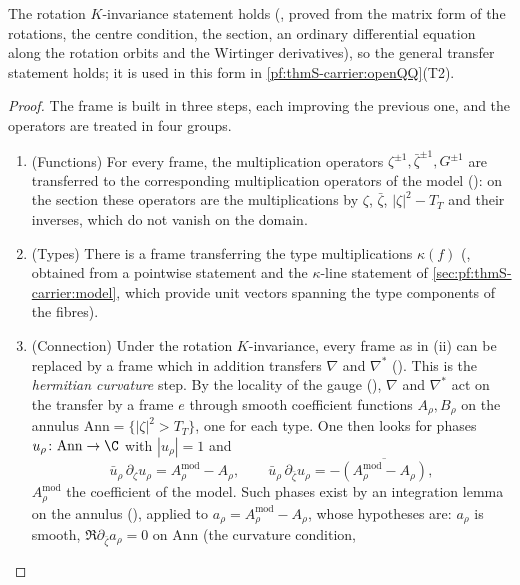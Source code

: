 The rotation $K$-invariance statement holds (,
proved from the matrix form of the rotations, the centre condition, the section, an ordinary differential equation along the
rotation orbits and the Wirtinger derivatives), so the general transfer statement holds; it is used in this form in
\cref{pf:thmS-carrier:openQQ}(T2).

\begin{proof}
The frame is built in three steps, each improving the previous one, and the operators are treated in four groups.
\begin{enumerate}[label=(\roman*)]
\item (Functions) For every frame, the multiplication operators $\zeta^{\pm1},\bar\zeta^{\pm1},G^{\pm1}$ are transferred to the
corresponding multiplication operators of the model
(): on the section these operators are the
multiplications by $\zeta$, $\bar\zeta$, $|\zeta|^2-T_T$ and their inverses, which do not vanish on the domain.
\item (Types) There is a frame transferring the type multiplications $\kappa(f)$
(, obtained from a pointwise statement and the
$\kappa$-line statement of \cref{sec:pf:thmS-carrier:model}, which provide unit vectors spanning the type components of the
fibres).
\item (Connection) Under the rotation $K$-invariance, every frame as in (ii) can be replaced by a frame which in addition
transfers $\nabla$ and $\nabla^*$ (). This is the
\emph{hermitian curvature} step. By the locality of the gauge
(), $\nabla$ and $\nabla^*$ act on the transfer
by a frame $e$ through smooth coefficient functions $A_\rho,B_\rho$ on the annulus $\mathrm{Ann}=\{|\zeta|^2>T_T\}$, one for
each type. One then looks for phases $u_\rho\colon\mathrm{Ann}\to\C$ with $|u_\rho|=1$ and
\[
\bar u_\rho\,\partial_\zeta u_\rho=A^{\mathrm{mod}}_\rho-A_\rho,\qquad
\bar u_\rho\,\partial_{\bar\zeta}u_\rho=-\overline{(A^{\mathrm{mod}}_\rho-A_\rho)},
\]
$A^{\mathrm{mod}}_\rho$ the coefficient of the model. Such phases exist by an integration lemma on the annulus
(), applied to $a_\rho=A^{\mathrm{mod}}_\rho-A_\rho$,
whose hypotheses are: $a_\rho$ is smooth, $\Re\partial_{\bar\zeta}a_\rho=0$ on $\mathrm{Ann}$ (the curvature condition,

\end{enumerate}
\end{proof}
